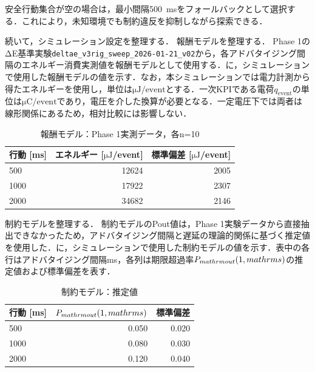 安全行動集合が空の場合は，最小間隔\SI{500}{\milli\second}をフォールバックとして選択する．これにより，未知環境でも制約違反を抑制しながら探索できる．

続いて，シミュレーション設定を整理する．
報酬モデルを整理する．
Phase 1のΔE基準実験\texttt{deltae\_v3rig\_sweep\_2026-01-21\_v02}から，各アドバタイジング間隔のエネルギー消費実測値を報酬モデルとして使用する．に，シミュレーションで使用した報酬モデルの値を示す．なお，本シミュレーションでは電力計測から得たエネルギーを使用し，単位は$\si{\micro\joule}/\text{event}$とする．一次KPIである電荷$q_{\mathrm{event}}$の単位は$\si{\micro\coulomb}/\text{event}$であり，電圧を介した換算が必要となる．一定電圧下では両者は線形関係にあるため，相対比較には影響しない．

\begin{table}[tb]
  \centering
  \caption{報酬モデル：Phase 1実測データ，各n=10}
  \label{tab:phase2_reward_model}
  \begin{tabular}{lrr}
    \toprule
    行動 [ms] & エネルギー [$\si{\micro\joule}$/event] & 標準偏差 [$\si{\micro\joule}$/event] \\
    \midrule
    500  & 12624 & 2005 \\
    1000 & 17922 & 2307 \\
    2000 & 34682 & 2146 \\
    \bottomrule
  \end{tabular}
\end{table}
制約モデルを整理する．
\label{sec:constraint_model_limitation}
制約モデルのPout値は，Phase 1実験データから直接抽出できなかったため，アドバタイジング間隔と遅延の理論的関係に基づく推定値を使用した．に，シミュレーションで使用した制約モデルの値を示す．表中の各行はアドバタイジング間隔ms，各列は期限超過率$P_{\\mathrm{out}}(1\\,\\mathrm{s})$の推定値および標準偏差を表す．

\begin{table}[tb]
  \centering
  \caption{制約モデル：推定値}
  \label{tab:phase2_constraint_model}
  \begin{tabular}{lrr}
    \toprule
    行動 [ms] & $P_{\\mathrm{out}}(1\\,\\mathrm{s})$ & 標準偏差 \\
    \midrule
    500  & 0.050 & 0.020 \\
    1000 & 0.080 & 0.030 \\
    2000 & 0.120 & 0.040 \\
    \bottomrule
  \end{tabular}
\end{table}

